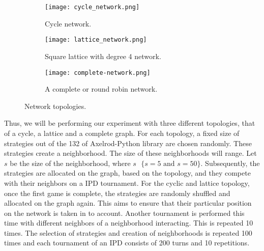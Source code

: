 \begin{figure}[!hbtp]  %
\centering
    \begin{subfigure}[t]{0.45\textwidth}
    \centering
        \texttt{[image: cycle\_network.png]}
    \caption{Cycle network.}
    \end{subfigure}
\hfill
    \begin{subfigure}[t]{0.52\textwidth}\centering
    \centering
        \texttt{[image: lattice\_network.png]}
    \caption{Square lattice with degree 4 network.}
    \end{subfigure}
\hfill
    \begin{subfigure}[t]{0.52\textwidth}\centering
    \centering
        \texttt{[image: complete-network.png]}
    \caption{A complete or round robin network.}
    \end{subfigure}
\caption{Network topologies.}
\label{fig:networks}
\end{figure}

Thus, we will be performing our experiment with three different topologies, that
of a cycle, a lattice and a complete graph.
For each topology, a fixed size of strategies out of the 132 of Axelrod-Python
library are chosen randomly. These strategies create a neighborhood.
The size of these neighborhoods will range. Let \( s\) be the size of
the neighborhood, where \(s \textrm{ }\{ s=5 \textrm{ and } s=50 \}\).
Subsequently, the strategies are allocated on the graph, based
on the topology, and they compete with their neighbors on a IPD tournament.
For the cyclic and lattice topology, once the first game is complete,
the strategies are randomly shuffled and allocated on the graph again. This aims
to ensure that their particular position on the network is taken in to account.
Another tournament is performed this time with different neighbors of a
neighborhood interacting.
This is repeated 10 times.
The selection of strategies and creation of neighborhoods is repeated 100 times
and each tournament of an IPD consists of 200 turns and 10 repetitions.

